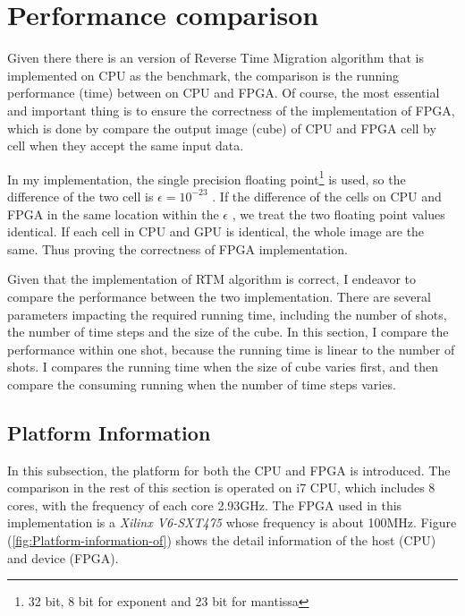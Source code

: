 \section{Performance comparison}

\label{sec:Performance comparision}

Given there there is an version of Reverse Time Migration algorithm
that is implemented on CPU as the benchmark, the comparison is the
running performance (time) between on CPU and FPGA. Of course, the
most essential and important thing is to ensure the correctness of
the implementation of FPGA, which is done by compare the output image
(cube) of CPU and FPGA cell by cell when they accept the same input
data.

In my implementation, the single precision floating point\footnote{32
bit, 8 bit for exponent and 23 bit for mantissa} is used, so the difference
of the two cell is \( \epsilon=10^{-23} \)
. If the difference of the cells on CPU and FPGA in the same location
within the \( \epsilon \)
, we treat the two floating point values identical. If each cell in
CPU and GPU is identical, the whole image are the same. Thus proving
the correctness of FPGA implementation.

Given that the implementation of RTM algorithm is correct, I endeavor
to compare the performance between the two implementation. There are
several parameters impacting the required running time, including
the number of shots, the number of time steps and the size of the
cube. In this section, I compare the performance within one shot,
because the running time is linear to the number of shots. I compares
the running time when the size of cube varies first, and then compare
the consuming running when the number of time steps varies.

\subsection{Platform Information} %

In this subsection, the platform for both the CPU and FPGA is introduced.
The comparison in the rest of this section is operated on i7 CPU,
which includes 8 cores, with the frequency of each core 2.93GHz. The
FPGA used in this implementation is a \emph{Xilinx V6-SXT475} whose
frequency is about 100MHz. Figure (\ref{fig:Platform-information-of})
shows the detail information of the host (CPU) and device (FPGA).

